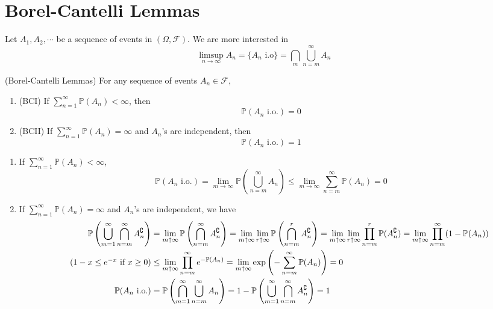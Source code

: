 \documentclass{huhtakm-template-book}
\newcommand{\prob}{\mathbb{P}}
\begin{document}
\section{Borel-Cantelli Lemmas}
Let $A_{1},A_{2},\cdots$ be a sequence of events in $(\Omega,\mathcal{F})$. We are more interested in
\begin{equation*}
	\limsup_{n\to\infty}A_{n}=\{A_{n}\text{ i.o}\}=\bigcap_{m}\bigcup_{n=m}^{\infty} A_{n}
\end{equation*}
\begin{thm}(Borel-Cantelli Lemmas)
	For any sequence of events $A_{n}\in\mathcal{F}$,
	\begin{enumerate}
		\item (BCI) If $\sum_{n=1}^{\infty}\prob(A_{n})<\infty$, then
		\begin{equation*}
			\prob(A_{n}\text{ i.o.})=0
		\end{equation*}
		\item (BCII) If $\sum_{n=1}^{\infty}\prob(A_{n})=\infty$ and $A_{n}$'s are independent, then
		\begin{equation*}
			\prob(A_{n}\text{ i.o.})=1
		\end{equation*}
	\end{enumerate}
\end{thm}
\begin{proofing}
	\begin{enumerate}
		\item If $\sum_{n=1}^{\infty}\prob(A_{n})<\infty$,
		\begin{equation*}
			\prob(A_{n}\text{ i.o.})=\lim_{m\to\infty}\prob\left(\bigcup_{n=m}^{\infty}A_{n}\right)\leq\lim_{m\to\infty}\sum_{n=m}^{\infty}\prob(A_{n})=0
		\end{equation*}
		\item If $\sum_{n=1}^{\infty}\prob(A_{n})=\infty$ and $A_{n}$'s are independent, we have
		\begin{align*}
			\prob\left(\bigcup_{m=1}^{\infty}\bigcap_{n=m}^{\infty}A_{n}^{\complement}\right)&=\lim_{m\uparrow\infty}\prob\left(\bigcap_{n=m}^{\infty}A_{n}^{\complement}\right)=\lim_{m\uparrow\infty}\lim_{r\uparrow\infty}\prob\left(\bigcap_{n=m}^{r}A_{n}^{\complement}\right)=\lim_{m\uparrow\infty}\lim_{r\uparrow\infty}\prod_{n=m}^{r}\prob(A_{n}^{\complement})=\lim_{m\uparrow\infty}\prod_{n=m}^{\infty}(1-\prob(A_{n}))\\
			\tag{$1-x\leq e^{-x}$ if $x\geq 0$}
			&\leq\lim_{m\uparrow\infty}\prod_{n=m}^{\infty}e^{-\prob(A_{n})}=\lim_{m\uparrow\infty}\exp\left(-\sum_{n=m}^{\infty}\prob(A_{n})\right)=0\\
			\prob(A_{n}\text{ i.o.})&=\prob\left(\bigcap_{m=1}^{\infty}\bigcup_{n=m}^{\infty}A_{n}\right)=1-\prob\left(\bigcup_{m=1}^{\infty}\bigcap_{n=m}^{\infty}A_{n}^{\complement}\right)=1
		\end{align*}
	\end{enumerate}
\end{proofing}
\end{document}
